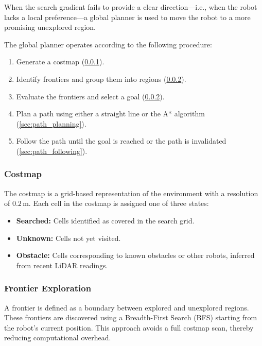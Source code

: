 When the search gradient fails to provide a clear direction—i.e., when the robot lacks a local preference—a global planner is used to move the robot to a more promising unexplored region.


The global planner operates according to the following procedure:

\begin{enumerate}
  \item Generate a costmap (\cref{sec:costmap}).
  \item Identify frontiers and group them into regions (\cref{sec:frontier_exploration}).
  \item Evaluate the frontiers and select a goal (\cref{sec:frontier_exploration}).
  \item Plan a path using either a straight line or the A* algorithm (\cref{sec:path_planning}).
  \item Follow the path until the goal is reached or the path is invalidated (\cref{sec:path_following}).
\end{enumerate}

\subsubsection{Costmap}
\label{sec:costmap}
The costmap is a grid-based representation of the environment with a resolution of $0.2\,\text{m}$. Each cell in the costmap is assigned one of three states:

\begin{itemize}
  \item \textbf{Searched:} Cells identified as covered in the search grid.
  \item \textbf{Unknown:} Cells not yet visited.
  \item \textbf{Obstacle:} Cells corresponding to known obstacles or other robots, inferred from recent LiDAR readings.
\end{itemize}

\subsubsection{Frontier Exploration}
\label{sec:frontier_exploration}
A frontier is defined as a boundary between explored and unexplored regions. These frontiers are discovered using a Breadth-First Search (BFS) starting from the robot's current position. This approach avoids a full costmap scan, thereby reducing computational overhead. \\

